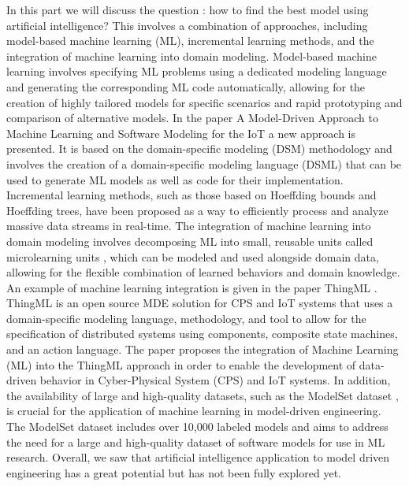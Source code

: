 In this part we will discuss the question : how to find the best model using artificial intelligence?
This involves a combination of approaches, including model-based machine learning (ML), incremental learning methods, and the integration of machine learning into domain modeling. 
Model-based machine learning involves specifying ML problems using a dedicated modeling language and generating the corresponding ML code automatically, allowing for the creation of highly tailored models for specific scenarios and rapid prototyping and comparison of alternative models\cite{evolutionMDE}. In the paper A Model-Driven Approach to Machine Learning and Software Modeling for the IoT \cite{mdApproach} a new approach is presented. It is based on the domain-specific modeling (DSM) methodology and involves the creation of a domain-specific modeling language (DSML) that can be used to generate ML models as well as code for their implementation.
Incremental learning methods, such as those based on Hoeffding bounds and Hoeffding trees, have been proposed as a way to efficiently process and analyze massive data streams in real-time\cite{evolutionMDE}. 
The integration of machine learning into domain modeling involves decomposing ML into small, reusable units called microlearning units \cite{evolutionMDE}, which can be modeled and used alongside domain data, allowing for the flexible combination of learned behaviors and domain knowledge. An example of machine learning integration is given in the paper ThingML \cite{ThingML}.  ThingML is an open source MDE solution for CPS and IoT systems that uses a domain-specific modeling language, methodology, and tool to allow for the specification of distributed systems using components, composite state machines, and an action language. The paper proposes the integration of Machine Learning (ML) into the ThingML approach in order to enable the development of data-driven behavior in Cyber-Physical System (CPS) and IoT systems.
In addition, the availability of large and high-quality datasets, such as the ModelSet dataset \cite{modelset}, is crucial for the application of machine learning in model-driven engineering. The ModelSet dataset includes over 10,000 labeled models and aims to address the need for a large and high-quality dataset of software models for use in ML research.
Overall, we saw that artificial intelligence application to model driven engineering has a great potential but has not been fully explored yet. 
